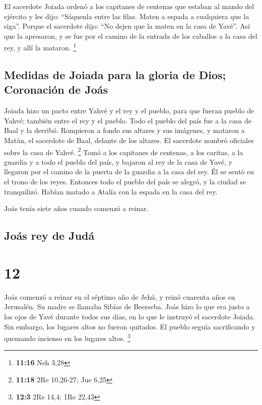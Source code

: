  El sacerdote Joiada ordenó a los capitanes de centenas
que estaban al mando del ejército y les dijo: ``Sáquenla entre las
filas. Maten a espada a cualquiera que la siga''. Porque el sacerdote
dijo: ``No dejen que la maten en la casa de Yavé''.  Así
que la apresaron, y se fue por el camino de la entrada de los caballos a
la casa del rey, y allí la mataron. \footnote{\textbf{11:16} Neh 3,28}

\hypertarget{medidas-de-joiada-para-la-gloria-de-dios-coronaciuxf3n-de-jouxe1s}{%
\subsection{Medidas de Joiada para la gloria de Dios; Coronación de
Joás}\label{medidas-de-joiada-para-la-gloria-de-dios-coronaciuxf3n-de-jouxe1s}}

 Joiada hizo un pacto entre Yahvé y el rey y el pueblo,
para que fueran pueblo de Yahvé; también entre el rey y el pueblo.
 Todo el pueblo del país fue a la casa de Baal y la
derribó. Rompieron a fondo sus altares y sus imágenes, y mataron a
Matán, el sacerdote de Baal, delante de los altares. El sacerdote nombró
oficiales sobre la casa de Yahvé. \footnote{\textbf{11:18} 2Re 10,26-27;
  Jue 6,25}  Tomó a los capitanes de centenas, a los
caritas, a la guardia y a todo el pueblo del país, y bajaron al rey de
la casa de Yavé, y llegaron por el camino de la puerta de la guardia a
la casa del rey. Él se sentó en el trono de los reyes. 
Entonces todo el pueblo del país se alegró, y la ciudad se tranquilizó.
Habían matado a Atalía con la espada en la casa del rey.

 Joás tenía siete años cuando comenzó a reinar.

\hypertarget{jouxe1s-rey-de-juduxe1}{%
\subsection{Joás rey de Judá}\label{jouxe1s-rey-de-juduxe1}}

\hypertarget{section-11}{%
\section{12}\label{section-11}}

 Joás comenzó a reinar en el séptimo año de Jehú, y reinó
cuarenta años en Jerusalén. Su madre se llamaba Sibías de Beerseba.
 Joás hizo lo que era justo a los ojos de Yavé durante
todos sus días, en lo que le instruyó el sacerdote Joiada.
 Sin embargo, los lugares altos no fueron quitados. El
pueblo seguía sacrificando y quemando incienso en los lugares altos.
\footnote{\textbf{12:3} 2Re 14,4; 1Re 22,43}

